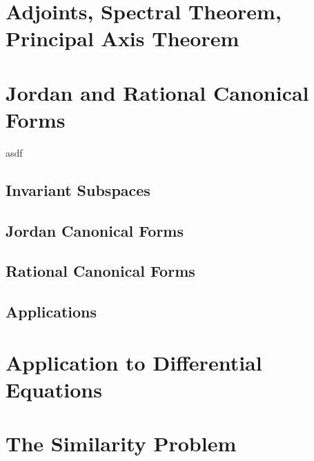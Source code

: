 \documentclass[11pt]{report}
\begin{document}
\chapter{Adjoints, Spectral Theorem, Principal Axis Theorem}


\chapter{Jordan and Rational Canonical Forms}
asdf
\section{Invariant Subspaces}
\section{Jordan Canonical Forms}
\section{Rational Canonical Forms}
\section{Applications}


\chapter{Application to Differential Equations}


\chapter{The Similarity Problem}
\end{document}
